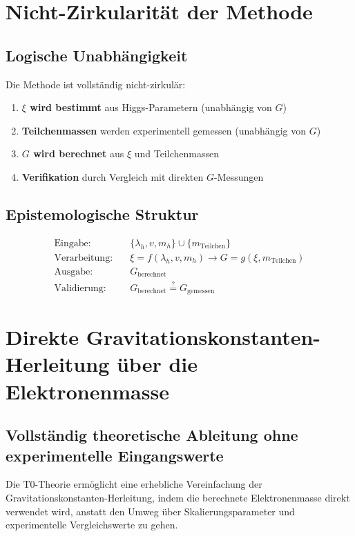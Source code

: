 \documentclass[12pt,a4paper]{article}
\theoremstyle{definition}
\begin{document}
	\section{Nicht-Zirkularität der Methode}
	
	\subsection{Logische Unabhängigkeit}
	
	Die Methode ist vollständig nicht-zirkulär:
	
	\begin{enumerate}
		\item \textbf{$\xi$ wird bestimmt} aus Higgs-Parametern (unabhängig von $G$)
		\item \textbf{Teilchenmassen} werden experimentell gemessen (unabhängig von $G$)
		\item \textbf{$G$ wird berechnet} aus $\xi$ und Teilchenmassen
		\item \textbf{Verifikation} durch Vergleich mit direkten $G$-Messungen
	\end{enumerate}
	
	\subsection{Epistemologische Struktur}
	
	\begin{align}
		\text{Eingabe:} \quad &\{\lambda_h, v, m_h\} \cup \{m_{\text{Teilchen}}\}\\
		\text{Verarbeitung:} \quad &\xi = f(\lambda_h, v, m_h) \rightarrow G = g(\xi, m_{\text{Teilchen}})\\
		\text{Ausgabe:} \quad &G_{\text{berechnet}}\\
		\text{Validierung:} \quad &G_{\text{berechnet}} \stackrel{?}{=} G_{\text{gemessen}}
	\end{align}
\section{Direkte Gravitationskonstanten-Herleitung über die Elektronenmasse}
\label{sec:direkte_elektronenmasse_herleitung}

\subsection{Vollständig theoretische Ableitung ohne experimentelle Eingangswerte}

Die T0-Theorie ermöglicht eine erhebliche Vereinfachung der Gravitationskonstanten-Herleitung, indem die berechnete Elektronenmasse direkt verwendet wird, anstatt den Umweg über Skalierungsparameter und experimentelle Vergleichswerte zu gehen.
\end{document}
